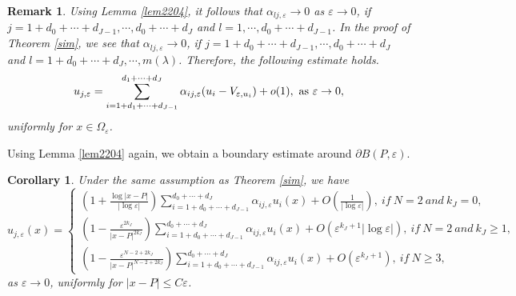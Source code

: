 \documentclass[11pt,reqno]{article}
\newtheorem{cor}[teo]{Corollary}
\newtheorem{rem}[teo]{Remark}
\numberwithin{equation}{section}
\newcommand\e\varepsilon
\renewcommand\O\Omega
\begin{document}
\begin{rem}\label{rem2204}
Using Lemma \ref{lem2204}, it follows that $\alpha_{lj,\e}\to 0$ as $\e\to 0$, if $j=1+d_0+\cdots+d_{J-1},\cdots,d_0+\cdots+d_J$ and  $l=1,\cdots,d_0+\cdots+d_{J-1}$.
    In the proof of Theorem \ref{sim}, we see that $\alpha_{lj,\e}\to 0$, if $j=1+d_0+\cdots+d_{J-1},\cdots,d_0+\cdots+d_J$ and $l=1+d_0+\cdots+d_J,\cdots,m(\lambda)$. Therefore,  the following estimate holds.
    \begin{equation}
        u_{j,\e}=\sum_{i=1+d_1+\cdots+d_{J-1}}^{d_1+\cdots+d_J}\alpha_{ij,\e}(u_i-V_{\e,u_i})+o(1), \hbox{ as } \e\to 0,
    \end{equation}
    uniformly for $x\in\O_\e$.
\end{rem}
Using Lemma \ref{lem2204} again, we obtain a boundary estimate around $\partial B(P,\e)$. 
\begin{cor}\label{cor2204}
     Under the same assumption as Theorem \ref{sim}, we have 
    $$
u_{j,\e}(x)=\begin{cases}
              \displaystyle\left  (1+\frac{\log |x-P|}{|\log\e|}\right)\sum_{i=1+d_0+\cdots+d_{J-1}}^{d_0+\cdots+d_J}\alpha_{ij,\e}u_i(x)
              +O\left(\frac{1}{|\log\e|}\right),\  if \ N=2  \ and\ k_J=0,\\
				 \displaystyle \left(1-\frac{\e^{2k_J}}{|x-P|^{2k_J}}\right)\sum_{i=1+d_0+\cdots+d_{J-1}}^{d_0+\cdots+d_J}\alpha_{ij,\e}u_i(x)+O(\e^{k_J+1}|\log\e|),\  if  \ N=2  \ and\ k_J\ge1,\\
                 \displaystyle   \left(1-\frac{\e^{N-2+2k_J}}{|x-P|^{N-2+2k_J}}
				\right)\sum_{i=1+d_0+\cdots+d_{J-1}}^{d_0+\cdots+d_J}\alpha_{ij,\e}u_i(x)+O(\e^{k_J+1}), \ if\ N\ge 3,
                \end{cases} 
$$
   as $\e\to 0$,  uniformly for $|x-P|\leq C\e$.
\end{cor}
\end{document}
